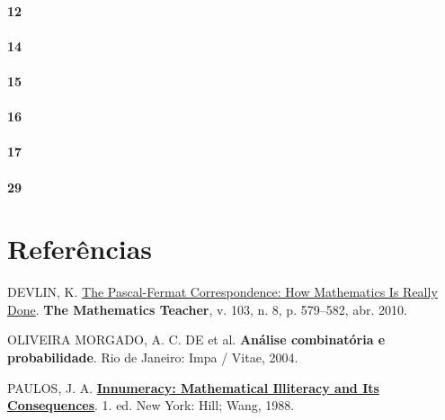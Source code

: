 \documentclass[
  11pt]{report}
\newlength{\cslhangindent}
\newlength{\cslentryspacingunit} %
\newenvironment{CSLReferences}[2] %
 {%
  \setlength{\parindent}{0pt}
  \ifodd #1
  \let\oldpar\par
  \def\par{\hangindent=\cslhangindent\oldpar}
  \fi
  \setlength{\parskip}{#2\cslentryspacingunit}
 }%
 {}
\begin{document}
\hypertarget{section-13}{%
\subsubsection*{12}\label{section-13}}

\hypertarget{section-14}{%
\subsubsection*{14}\label{section-14}}

\hypertarget{section-15}{%
\subsubsection*{15}\label{section-15}}

\hypertarget{section-16}{%
\subsubsection*{16}\label{section-16}}

\hypertarget{section-17}{%
\subsubsection*{17}\label{section-17}}

\hypertarget{section-18}{%
\subsubsection*{29}\label{section-18}}

\hypertarget{referuxeancias}{%
\chapter*{Referências}\label{referuxeancias}}

\hypertarget{refs}{}
\begin{CSLReferences}{0}{1}
\leavevmode{}%
DEVLIN, K. \href{https://doi.org/10.5951/mt.103.8.0579}{The {P}ascal-{F}ermat Correspondence: How Mathematics Is Really Done}. \textbf{The Mathematics Teacher}, v. 103, n. 8, p. 579--582, abr. 2010.

\leavevmode{}%
OLIVEIRA MORGADO, A. C. DE et al. \textbf{An{á}lise combinat{ó}ria e probabilidade}. Rio de Janeiro: Impa / Vitae, 2004.

\leavevmode{}%
PAULOS, J. A. \textbf{\href{http://gen.lib.rus.ec/book/index.php?md5=20A842C0E7EB7F8992EDDA0082E9B76F}{Innumeracy: Mathematical Illiteracy and Its Consequences}}. 1. ed. New York: Hill; Wang, 1988.

\end{CSLReferences}
\end{document}
